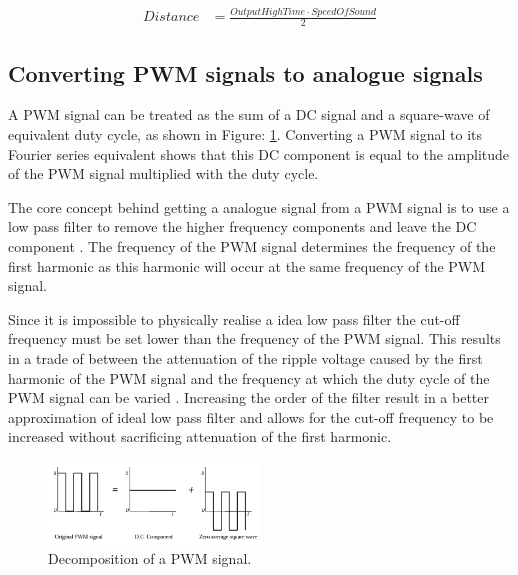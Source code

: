 \begin{align}\label{eqn:sonicsesns_lit_dist}
Distance & = \frac{OutputHighTime \cdot SpeedOfSound}{2}
\end{align}

\newpage
\subsection{Converting PWM signals to analogue signals}
A PWM signal can be treated as the sum of a DC signal and a square-wave of equivalent duty cycle, as shown in Figure: \ref{fig:sonicsen_pwm}. Converting a PWM signal to its Fourier series equivalent shows that this DC component is equal to the amplitude of the PWM signal multiplied with the duty cycle\cite{Design_SonicSens_Filter}.

The core concept behind getting a analogue signal from a PWM signal is to use a low pass filter to remove the higher frequency components and leave the DC component \cite{Design_SonicSens_Filter}. The frequency of the PWM signal determines the frequency of the first harmonic as this harmonic will occur at the same frequency of the PWM signal.

Since it is impossible to physically realise a idea low pass filter the cut-off frequency must be set lower than the frequency of the PWM signal. This results in a trade of between the attenuation of the ripple voltage caused by the first harmonic of the PWM signal and the frequency at which the duty cycle of the PWM signal can be varied \cite{Design_SonicSens_Filter}. Increasing the order of the filter result in a better approximation of ideal low pass filter and allows for the cut-off frequency to be increased without sacrificing attenuation of the first harmonic.

\begin{figure}[H]
\centering
\includegraphics[width=0.5\textwidth]{./Figures/SonicSens_PWM.png}
\caption{Decomposition of a PWM signal\cite{Design_SonicSens_Filter}.}
\label{fig:sonicsen_pwm}	
\end{figure}